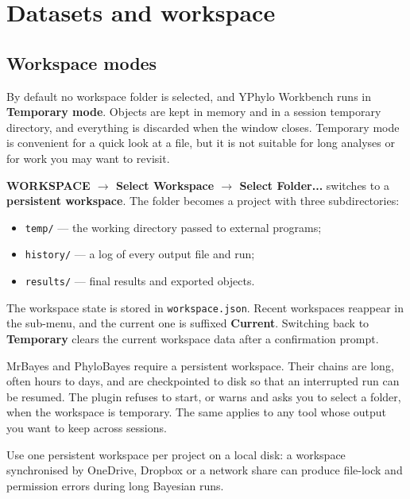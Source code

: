 \documentclass[10pt]{report}
\begin{document}
\chapter{Datasets and workspace}

\section{Workspace modes}

By default no workspace folder is selected, and YPhylo Workbench runs in
\textbf{Temporary mode}. Objects are kept in memory and in a session temporary
directory, and everything is discarded when the window closes. Temporary mode
is convenient for a quick look at a file, but it is not suitable for long
analyses or for work you may want to revisit.

\textbf{WORKSPACE $\rightarrow$ Select Workspace $\rightarrow$ Select Folder...}
switches to a \textbf{persistent workspace}. The folder becomes a project with
three subdirectories:

\begin{itemize}
  \item \texttt{temp/} --- the working directory passed to external programs;
  \item \texttt{history/} --- a log of every output file and run;
  \item \texttt{results/} --- final results and exported objects.
\end{itemize}

The workspace state is stored in \texttt{workspace.json}. Recent workspaces
reappear in the sub-menu, and the current one is suffixed \textbf{Current}.
Switching back to \textbf{Temporary} clears the current workspace data after a
confirmation prompt.

MrBayes and PhyloBayes require a persistent workspace. Their chains are long,
often hours to days, and are checkpointed to disk so that an interrupted run
can be resumed. The plugin refuses to start, or warns and asks you to select a
folder, when the workspace is temporary. The same applies to any tool whose
output you want to keep across sessions.

Use one persistent workspace per project on a local disk: a workspace
synchronised by OneDrive, Dropbox or a network share can produce file-lock and
permission errors during long Bayesian runs.
\end{document}
